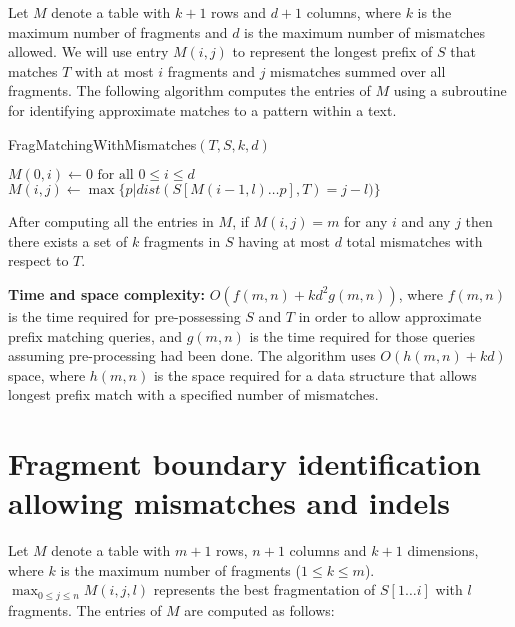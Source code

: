 Let $M$ denote a table with $k+1$ rows and $d+1$ columns, where $k$ is
the maximum number of fragments and $d$ is the maximum number of
mismatches allowed. We will use entry $M(i,j)$ to represent the longest
prefix of $S$ that matches $T$ with at most $i$ fragments and $j$
mismatches summed over all fragments. The following algorithm computes
the entries of $M$ using a subroutine for identifying approximate
matches to a pattern within a text.

\begin{algorithm}[H]
\caption{FragMatchingWithMismatches$(T, S, k, d)$}
\begin{algorithmic}[1]
  \STATE $M(0,i) \leftarrow 0 \text{ for all } 0 \leq i \leq d$
        \STATE $M(i,j) \leftarrow \max \{p | dist(S[M(i-1,l) \dots p],
                  T) = j-l)\}$
      \ENDFOR
    \ENDFOR
  \ENDFOR
\end{algorithmic}
\end{algorithm}

After computing all the entries in $M$, if $M(i,j) = m$ for any $i$ and
any $j$ then there exists a set of $k$ fragments in $S$ having at most
$d$ total mismatches with respect to $T$.

\textbf{Time and space complexity:} $O(f(m,n) + kd^2g(m,n))$, where
$f(m,n)$ is the time required for pre-possessing $S$ and $T$ in order to
allow approximate prefix matching queries, and $g(m,n)$ is the time
required for those queries assuming pre-processing had been done. The
algorithm uses $O(h(m,n) + kd)$ space, where $h(m,n)$ is the space
required for a data structure that allows longest prefix match with a
specified number of mismatches.

\section{Fragment boundary identification allowing mismatches and indels}
Let $M$ denote a table with $m+1$ rows, $n+1$ columns and $k+1$
dimensions, where $k$ is the maximum number of fragments ($1 \leq k \leq
m$).  $\max_{0 \leq j \leq n}M(i,j,l)$ represents the best fragmentation
of $S[1 \dots i]$ with $l$ fragments. The entries of $M$ are computed as
follows:

